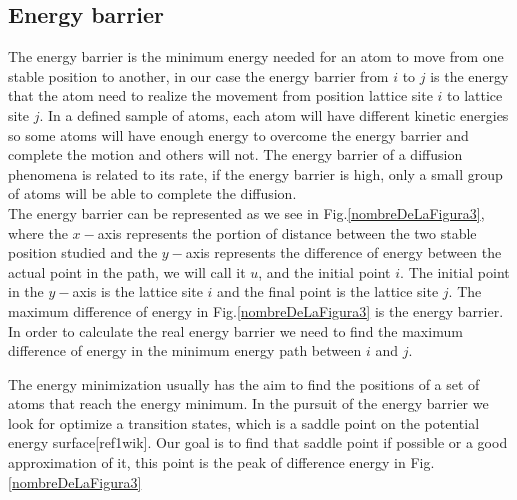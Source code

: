 \documentclass[10pt,a4paper]{article}
\begin{document}
\subsection{Energy barrier}
\label{Energy barrier}
The energy barrier is the minimum energy needed for an atom to move from one stable position to another, in our case the energy barrier from $i$ to $j$ is the energy that the atom need to realize the movement from position lattice site $i$ to lattice site $j$. In a defined sample of atoms, each atom will have different kinetic energies so some atoms will have enough energy to overcome the energy barrier and complete the motion and others will not. The energy barrier of a diffusion phenomena is related to its rate, if the energy barrier is high, only a small group of atoms will be able to complete the diffusion.
\\
The energy barrier can be represented as we see in Fig.\ref{nombreDeLaFigura3}, where the $x-$axis represents the portion of distance between the two stable position studied and the $y-$axis represents the difference of energy between the actual point in the path, we will call it $u$, and the initial point $i$. The initial point in the  $y-$axis is the lattice site $i$ and the final point is the lattice site $j$. The maximum difference of energy in Fig.\ref{nombreDeLaFigura3} is the energy barrier. In order to calculate the real energy barrier we need to find the maximum difference of energy in the minimum energy path between $i$ and $j$. 

The energy minimization usually has the aim to find the positions of a set of atoms that reach the energy minimum. In the pursuit of the energy barrier we look for optimize a transition states, which is a saddle point on the potential energy surface[ref1wik]. Our goal is to find that saddle point if possible or a good approximation of it, this point is the peak of difference energy in Fig.\ref{nombreDeLaFigura3}

\end{document}
